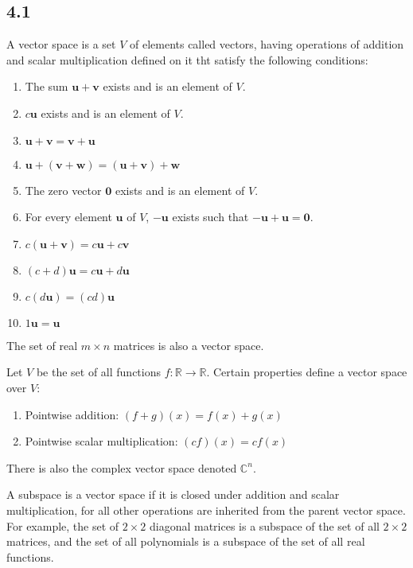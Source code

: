 \documentclass{article}
\begin{document}
    \subsection*{4.1}
    A vector space is a set $V$ of elements called vectors,
    having operations of addition and scalar multiplication
    defined on it tht satisfy the following conditions:
    \begin{enumerate}
        \item The sum $\mathbf{u} + \mathbf{v}$ exists and is an element of $V$.
        \item $c \mathbf{u}$ exists and is an element of $V$.
        \item $\mathbf{u} + \mathbf{v} = \mathbf{v} + \mathbf{u}$
        \item $\mathbf{u} + (\mathbf{v} + \mathbf{w}) = (\mathbf{u} + \mathbf{v}) + \mathbf{w}$
        \item The zero vector $\mathbf{0}$ exists and is an element of $V$.
        \item For every element $\mathbf{u}$ of $V$, $\mathbf{-u}$ exists such that $\mathbf{-u} + \mathbf{u} = \mathbf{0}$.
        \item $c(\mathbf{u} + \mathbf{v}) = c\mathbf{u} + c\mathbf{v}$
        \item $(c + d)\mathbf{u} = c\mathbf{u} + d\mathbf{u}$
        \item $c(d \mathbf{u}) = (cd)\mathbf{u}$
        \item $1\mathbf{u} = \mathbf{u}$
    \end{enumerate}
    The set of real $m \times n$ matrices is also a vector space.

    Let $V$ be the set of all functions $f: \mathbb{R} \rightarrow \mathbb{R}$. 
    Certain properties define a vector space over $V$:
    \begin{enumerate}
        \item Pointwise addition: $(f + g)(x) = f(x) + g(x)$
        \item Pointwise scalar multiplication: $(cf)(x) = cf(x)$
    \end{enumerate}
    There is also the complex vector space denoted $\mathbb{C}^n$.

    A subspace is a vector space if it is closed under addition and scalar multiplication, 
    for all other operations are inherited from the parent vector space. 
    For example, the set of $2 \times 2$ diagonal matrices is a subspace of the set of all $2 \times 2$ matrices,
    and the set of all polynomials is a subspace of the set of all real functions.
\end{document}
